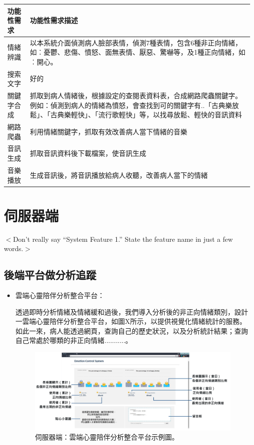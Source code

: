 \documentclass[12pt]{scrreprt}
\begin{document}
\begin{center}  
\begin{tabular}{|l| p{10cm}|}  
\hline  
功能性需求 & 功能性需求描述   \\ \hline  
情緒辨識 &以本系統介面偵測病人臉部表情，偵測7種表情，包含6種非正向情緒，如︰憂鬱、悲傷、憤怒、面無表情、厭惡、驚嚇等，及1種正向情緒，如︰開心。    \\ \hline  
搜索文字& 好的\\\hline
關鍵字合成 & 抓取到病人情緒後，根據設定的查閱表資料表，合成網路爬蟲關鍵字。例如：偵測到病人的情緒為憤怒，會查找到可的關鍵字有..「古典樂放鬆」、「古典樂輕快」、「流行歌輕快」等，以找尋放鬆、輕快的音訊資料    \\ \hline  
網路爬蟲 & 利用情緒關鍵字，抓取有效改善病人當下情緒的音樂 \\ \hline
音訊生成 & 抓取音訊資料後下載檔案，使音訊生成 \\ \hline
音樂播放 & 生成音訊後，將音訊播放給病人收聽，改善病人當下的情緒 \\ \hline

\end{tabular}  
\end{center}  


\section{伺服器端}
$<$Don’t really say “System Feature 1.” State the feature name in just a few 
words.$>$

\subsection{後端平台做分析追蹤}
\begin{itemize}
\item{\begin{bfseries}{雲端心靈陪伴分析整合平台：}\end{bfseries}}
透過即時分析情緒及情緒緩和過後，我們導入分析後的非正向情緒類別，設計一雲端心靈陪伴分析整合平台，如圖X所示，以提供視覺化情緒統計的服務。如此一來，病人能透過網頁，查詢自己的歷史狀況，以及分析統計結果；查詢自己常處於哪類的非正向情緒...........。
\begin{figure}[!h]
\begin{center}
\includegraphics[width=1\textwidth]{./figs/Web.pdf}
\end{center}
\caption{伺服器端：雲端心靈陪伴分析整合平台示例圖。}
\label{fig:webframework}
\end{figure}
\end{itemize}
\end{document}

